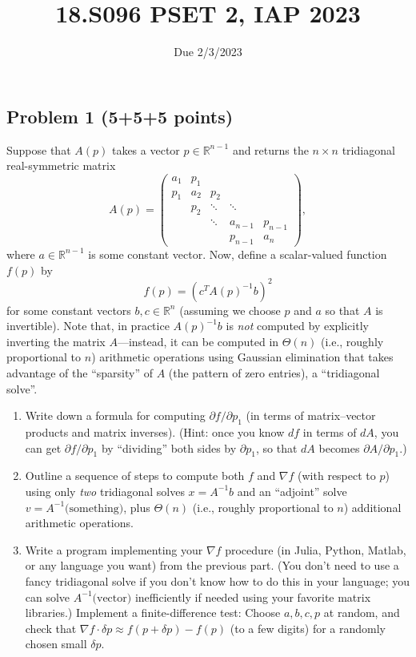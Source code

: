 \documentclass{article}
\title{18.S096 PSET 2, IAP 2023}
\date{Due 2/3/2023}
\begin{document}
\maketitle


\subsection*{Problem 1 (5+5+5 points)}

Suppose that $A(p)$ takes a vector $p\in\mathbb{R}^{n-1}$ and returns
the $n\times n$ tridiagonal real-symmetric matrix
\[
A(p)=\left(\begin{array}{ccccc}
a_{1} & p_{1}\\
p_{1} & a_{2} & p_{2}\\
 & p_{2} & \ddots & \ddots\\
 &  & \ddots & a_{n-1} & p_{n-1}\\
 &  &  & p_{n-1} & a_{n}
\end{array}\right),
\]
where $a\in\mathbb{R}^{n-1}$ is some constant vector. Now, define
a scalar-valued function $f(p)$ by 
\[
f(p)=\left(c^{T}A(p)^{-1}b\right)^{2}
\]
for some constant vectors $b,c\in\mathbb{R}^{n}$ (assuming we choose
$p$ and $a$ so that $A$ is invertible). Note that, in practice
$A(p)^{-1}b$ is \emph{not }computed by explicitly inverting the matrix
$A$---instead, it can be computed in $\Theta(n)$ (i.e., roughly
proportional to $n$) arithmetic operations using Gaussian elimination
that takes advantage of the ``sparsity'' of $A$ (the pattern of
zero entries), a ``tridiagonal solve''.
\begin{enumerate}
\item Write down a formula for computing $\partial f/\partial p_{1}$ (in
terms of matrix--vector products and matrix inverses). (Hint: once
you know $df$ in terms of $dA$, you can get $\partial f/\partial p_{1}$
by ``dividing'' both sides by $\partial p_{1}$, so that $dA$ becomes
$\partial A/\partial p_{1}$.)
\item Outline a sequence of steps to compute both $f$ and $\nabla f$ (with
respect to $p$) using only \emph{two} tridiagonal solves $x=A^{-1}b$
and an ``adjoint'' solve $v=A^{-1}\text{(something)}$, plus $\Theta(n)$
(i.e., roughly proportional to $n$) additional arithmetic operations.
\item Write a program implementing your $\nabla f$ procedure (in Julia,
Python, Matlab, or any language you want) from the previous part.
(You don't need to use a fancy tridiagonal solve if you don't know
how to do this in your language; you can solve $A^{-1}\text{(vector)}$
inefficiently if needed using your favorite matrix libraries.) Implement
a finite-difference test: Choose $a,b,c,p$ at random, and check that
$\nabla f\cdot\delta p\approx f(p+\delta p)-f(p)$ (to a few digits)
for a randomly chosen small $\delta p$.
\end{enumerate}
\end{document}
